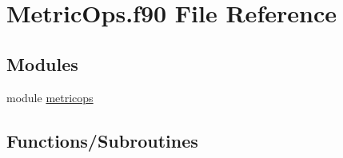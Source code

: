 \hypertarget{MetricOps_8f90}{}\section{Metric\+Ops.\+f90 File Reference}
\label{MetricOps_8f90}
\subsection*{Modules}
\begin{DoxyCompactItemize}
\item 
module \hyperlink{namespacemetricops}{metricops}
\end{DoxyCompactItemize}
\subsection*{Functions/\+Subroutines}
